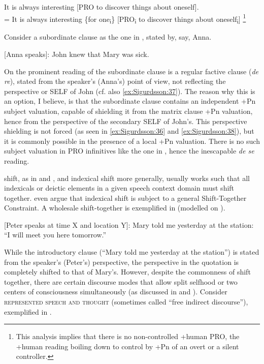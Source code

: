 \documentclass[output=paper]{LSP/langsci}
\begin{document}
\ea%
    \label{ex:Sigurdsson:41}
  	  It is always interesting [PRO to discover things about oneself].\\
	  = It is always interesting \{for one\textsubscript{i}\} [PRO\textsubscript{i} to discover things about oneself\textsubscript{i}] \footnote{This analysis implies that there is no non-controlled +human PRO, the +human reading boiling down to control by +Pn of an overt or a silent controller.}
\z

Consider a subordinate clause as the one in , stated by, say, Anna.

\ea%
    \label{ex:Sigurdsson:42}
  	  [Anna speaks]:  John knew that Mary was sick.
\z

On the prominent reading of  the subordinate clause is a regular factive clause (\textit{de re}), stated from the speaker’s (Anna’s) point of view, not reflecting the perspective or SELF of John (cf. also \ref{ex:Sigurdsson:37}). The reason why this is an option, I believe, is that the subordinate clause contains an independent +Pn subject valuation, capable of shielding it from the matrix clause +Pn valuation, hence from the perspective of the secondary SELF of John’s. This perspective shielding is not forced (as seen in \ref{ex:Sigurdsson:36} and \ref{ex:Sigurdsson:38}), but it is commonly possible in the presence of a local +Pn valuation. There is no such subject valuation in PRO infinitives like the one in , hence the inescapable \textit{de se} reading.

 shift, as in  and , and indexical shift more generally, usually works such that all indexicals or deictic elements in a given speech context domain must shift together. \citet{AnandNevins2004} even argue that indexical shift is subject to a general Shift-Together Constraint. A wholesale shift-together is exemplified in  (modelled on \citealt[25]{Banfield1982}).

\ea%
    \label{ex:Sigurdsson:43}
  	  [Peter speaks at time X and location Y]:  Mary told me yesterday at the station: “I will meet you here tomorrow.”
\z

While the introductory clause (“Mary told me yesterday at the station”) is stated from the speaker’s (Peter’s) perspective, the perspective in the quotation is completely shifted to that of Mary’s. However, despite the commonness of shift together, there are certain discourse modes that allow split selfhood or two centers of consciousness simultaneously (as discussed in \citealt{Banfield1982} and \citealt{Sigurðsson1990}). Consider \textsc{represented speech and thought} (sometimes called “free indirect discourse”), exemplified in .
\end{document}
